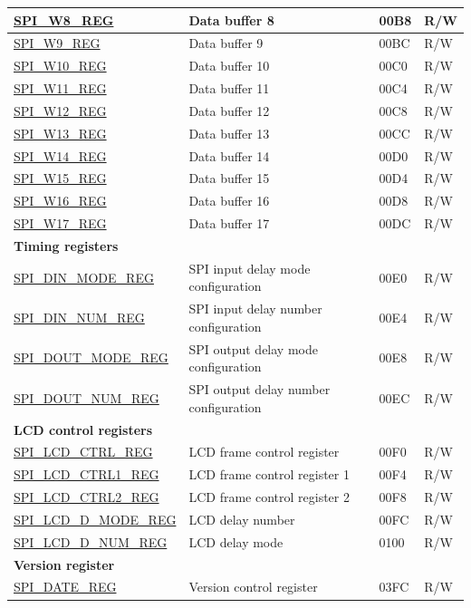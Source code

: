 \begin{longtable}{ | p{6cm} | p{7.2cm} | p{1.3cm} | p{1cm} | }
\hyperref[regdesc:SPIW8REG]{SPI\_W8\_REG} & Data buffer 8 & \hexprefix{}00B8 & R/W \\ \hline
\hyperref[regdesc:SPIW9REG]{SPI\_W9\_REG} & Data buffer 9 & \hexprefix{}00BC & R/W \\ \hline
\hyperref[regdesc:SPIW10REG]{SPI\_W10\_REG} & Data buffer 10 & \hexprefix{}00C0 & R/W \\ \hline
\hyperref[regdesc:SPIW11REG]{SPI\_W11\_REG} & Data buffer 11 & \hexprefix{}00C4 & R/W \\ \hline
\hyperref[regdesc:SPIW12REG]{SPI\_W12\_REG} & Data buffer 12 & \hexprefix{}00C8 & R/W \\ \hline
\hyperref[regdesc:SPIW13REG]{SPI\_W13\_REG} & Data buffer 13 & \hexprefix{}00CC & R/W \\ \hline
\hyperref[regdesc:SPIW14REG]{SPI\_W14\_REG} & Data buffer 14 & \hexprefix{}00D0 & R/W \\ \hline
\hyperref[regdesc:SPIW15REG]{SPI\_W15\_REG} & Data buffer 15 & \hexprefix{}00D4 & R/W \\ \hline
\hyperref[regdesc:SPIW16REG]{SPI\_W16\_REG} & Data buffer 16 & \hexprefix{}00D8 & R/W \\ \hline
\hyperref[regdesc:SPIW17REG]{SPI\_W17\_REG} & Data buffer 17 & \hexprefix{}00DC & R/W \\ \hline
\multicolumn{4}{|l|}{\textbf{Timing registers}} \\ \hline
\hyperref[regdesc:SPIDINMODEREG]{SPI\_DIN\_MODE\_REG} & SPI input delay mode configuration & \hexprefix{}00E0 & R/W \\ \hline
\hyperref[regdesc:SPIDINNUMREG]{SPI\_DIN\_NUM\_REG} & SPI input delay number configuration & \hexprefix{}00E4 & R/W \\ \hline
\hyperref[regdesc:SPIDOUTMODEREG]{SPI\_DOUT\_MODE\_REG} & SPI output delay mode configuration & \hexprefix{}00E8 & R/W \\ \hline
\hyperref[regdesc:SPIDOUTNUMREG]{SPI\_DOUT\_NUM\_REG} & SPI output delay number configuration & \hexprefix{}00EC & R/W \\ \hline
\multicolumn{4}{|l|}{\textbf{LCD control registers}} \\ \hline
\hyperref[regdesc:SPILCDCTRLREG]{SPI\_LCD\_CTRL\_REG} & LCD frame control register & \hexprefix{}00F0 & R/W \\ \hline
\hyperref[regdesc:SPILCDCTRL1REG]{SPI\_LCD\_CTRL1\_REG} & LCD frame control register 1& \hexprefix{}00F4 & R/W \\ \hline
\hyperref[regdesc:SPILCDCTRL2REG]{SPI\_LCD\_CTRL2\_REG} & LCD frame control register 2& \hexprefix{}00F8 & R/W \\ \hline
\hyperref[regdesc:SPILCDDMODEREG]{SPI\_LCD\_D\_MODE\_REG} & LCD delay number & \hexprefix{}00FC & R/W \\ \hline
\hyperref[regdesc:SPILCDDNUMREG]{SPI\_LCD\_D\_NUM\_REG} & LCD delay mode & \hexprefix{}0100 & R/W \\ \hline
\multicolumn{4}{|l|}{\textbf{Version register}} \\ \hline
\hyperref[regdesc:SPIDATEREG]{SPI\_DATE\_REG} & Version control register & \hexprefix{}03FC & R/W \\ \hline
\end{longtable}
